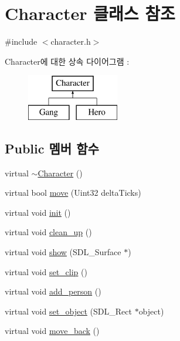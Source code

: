 \hypertarget{class_character}{\section{\-Character 클래스 참조}
\label{class_character}
}


{\ttfamily \#include $<$character.\-h$>$}

\-Character에 대한 상속 다이어그램 \-: \begin{figure}[H]
\begin{center}
\leavevmode
\includegraphics[height=2.000000cm]{class_character}
\end{center}
\end{figure}
\subsection*{\-Public 멤버 함수}
\begin{DoxyCompactItemize}
\item 
virtual \hyperlink{class_character_a9e9be564d05ded80962b2045aa70b3fc}{$\sim$\-Character} ()
\item 
virtual bool \hyperlink{class_character_a32f64bd79aac4bcdfa3878b34ffd39da}{move} (\-Uint32 delta\-Ticks)
\item 
virtual void \hyperlink{class_character_ae026a3baf7b9a31c270b9b0596c5e181}{init} ()
\item 
virtual void \hyperlink{class_character_a2304027ce7b4caf5a1851e371f3071cd}{clean\-\_\-up} ()
\item 
virtual void \hyperlink{class_character_aee8d4cab5de7363e08ebcaf14171a454}{show} (\-S\-D\-L\-\_\-\-Surface $\ast$)
\item 
virtual void \hyperlink{class_character_ae29d39664b615ddee1fd855569cade90}{set\-\_\-clip} ()
\item 
virtual void \hyperlink{class_character_a074348cfffee21b386e6ed3d950a7f2f}{add\-\_\-person} ()
\item 
virtual void \hyperlink{class_character_a24e66bb11b377efa0079393d6ed99e89}{set\-\_\-object} (\-S\-D\-L\-\_\-\-Rect $\ast$object)
\item 
virtual void \hyperlink{class_character_a33e738893b424f6e890f49d756c7ffe6}{move\-\_\-back} ()
\end{DoxyCompactItemize}

